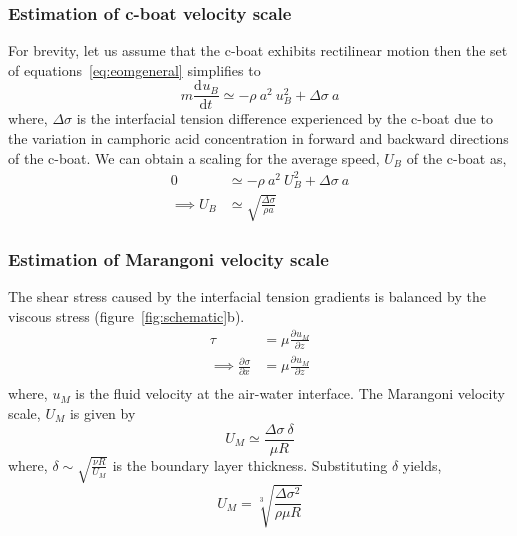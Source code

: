 \documentclass[aps, twocolumn, floatfix, superscriptaddress]{revtex4}
\newcommand{\tdc}[3][]{\frac{\mathrm{d}^{#1}#2}{\mathrm{d}#3^{#1}}} %
\newcommand{\pdc}[3][]{\frac{\partial^{#1} #2}{\partial #3^{#1}}} %
\begin{document}
\subsubsection{Estimation of c-boat velocity scale}
For brevity, let us assume that the c-boat exhibits rectilinear motion then the set of equations~\ref{eq:eomgeneral} simplifies to
\begin{equation}
m \tdc{u_{B}}{t} \simeq -\rho\ a^{2}\ u_{B}^{2} + \Delta\sigma\ a
\end{equation}
where, $\Delta\sigma$ is the interfacial tension difference experienced by the c-boat due to the variation in camphoric acid concentration in forward and backward directions of the c-boat. We can obtain a scaling for the average speed, $U_{B}$ of the c-boat as, 
\begin{align}
0 &\simeq -\rho\ a^{2}\ U_{B}^{2} + \Delta\sigma\ a  \nonumber \\
\implies U_{B} &\simeq \sqrt{\frac{\Delta\sigma}{\rho a}} 
\end{align}
\subsubsection{Estimation of Marangoni velocity scale}
The shear stress caused by the interfacial tension gradients is balanced by the viscous stress (figure~\ref{fig:schematic}b).
\begin{align*}
\tau &= \mu \pdc{u_{M}}{z} \\
\implies \pdc{\sigma}{x} &= \mu \pdc{u_{M}}{z} \\
\end{align*} 
where, $u_{M}$ is the fluid velocity at the air-water interface. The Marangoni velocity scale, $U_{M}$ is given by
\begin{equation*}
U_{M} \simeq \frac{\Delta\sigma\ \delta}{\mu R}
\end{equation*}
where, $\delta \sim \sqrt{\frac{\nu R}{U_{M}}}$ is the boundary layer thickness. Substituting $\delta$ yields, 
\begin{equation}
U_{M} = \sqrt[3]{\frac{\Delta\sigma^{2}}{\rho \mu R}}
\end{equation}
\end{document}
